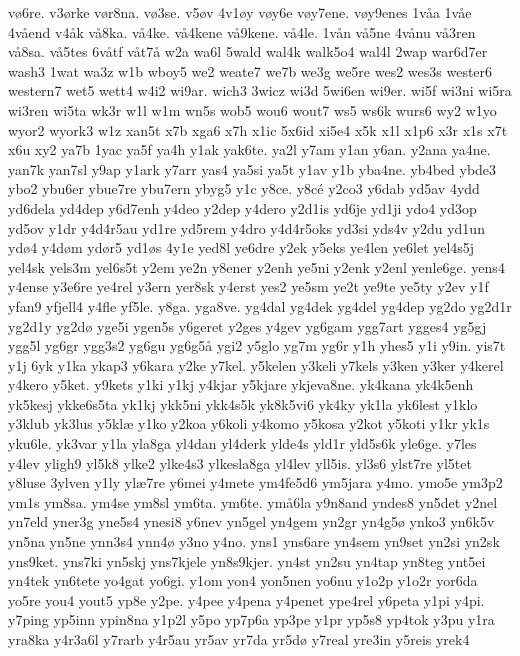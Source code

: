 {v^^f86re.
v3^^f8rke
v^^f8r8na.
v^^f83se.
v5^^f8v
4v1^^f8y
v^^f8y6e
v^^f8y7ene.
v^^f8y9enes
1v^^e5a
1v^^e5e
4v^^e5end
v4^^e5k
v^^e58ka.
v^^e54ke.
v^^e54kene
v^^e59kene.
v^^e54le.
1v^^e5n
v^^e55ne
4v^^e5nu
v^^e53ren
v^^e58sa.
v^^e55tes
6v^^e5tf
v^^e5t7^^e5
w2a
wa6l
5wald
wal4k
walk5o4
wal4l
2wap
war6d7er
wash3
1wat
wa3z
w1b
wboy5
we2
weate7
we7b
we3g
we5re
wes2
wes3s
wester6
western7
wet5
wett4
w4i2
wi9ar.
wich3
3wicz
wi3d
5wi6en
wi9er.
wi5f
wi3ni
wi5ra
wi3ren
wi5ta
wk3r
w1l
w1m
wn5s
wob5
wou6
wout7
ws5
ws6k
wurs6
wy2
w1yo
wyor2
wyork3
w1z
xan5t
x7b
xga6
x7h
x1ic
5x6id
xi5e4
x5k
x1l
x1p6
x3r
x1s
x7t
x6u
xy2
ya7b
1yac
ya5f
ya4h
y1ak
yak6te.
ya2l
y7am
y1an
y6an.
y2ana
ya4ne.
yan7k
yan7sl
y9ap
y1ark
y7arr
yas4
ya5si
ya5t
y1av
y1b
yba4ne.
yb4bed
ybde3
ybo2
ybu6er
ybue7re
ybu7ern
ybyg5
y1c
y8ce.
y8c^^e9
y2co3
y6dab
yd5av
4ydd
yd6dela
yd4dep
y6d7enh
y4deo
y2dep
y4dero
y2d1is
yd6je
yd1ji
ydo4
yd3op
yd5ov
y1dr
y4d4r5au
yd1re
yd5rem
y4dro
y4d4r5oks
yd3si
yds4v
y2du
yd1un
yd^^f84
y4d^^f8m
yd^^f8r5
yd1^^f8s
4y1e
yed8l
ye6dre
y2ek
y5eks
ye4len
ye6let
yel4s5j
yel4sk
yels3m
yel6s5t
y2em
ye2n
y8ener
y2enh
ye5ni
y2enk
y2enl
yenle6ge.
yens4
y4ense
y3e6re
ye4rel
y3ern
yer8sk
y4erst
yes2
ye5sm
ye2t
ye9te
ye5ty
y2ev
y1f
yfan9
yfjell4
y4fle
yf5le.
y8ga.
yga8ve.
yg4dal
yg4dek
yg4del
yg4dep
yg2do
yg2d1r
yg2d1y
yg2d^^f8
yge5i
ygen5s
y6geret
y2ges
y4gev
yg6gam
ygg7art
ygges4
yg5gj
ygg5l
yg6gr
ygg3s2
yg6gu
yg6g5^^e5
ygi2
y5glo
yg7m
yg6r
y1h
yhes5
y1i
y9in.
yis7t
y1j
6yk
y1ka
ykap3
y6kara
y2ke
y7kel.
y5kelen
y3keli
y7kels
y3ken
y3ker
y4kerel
y4kero
y5ket.
y9kets
y1ki
y1kj
y4kjar
y5kjare
ykjeva8ne.
yk4kana
yk4k5enh
yk5kesj
ykke6s5ta
yk1kj
ykk5ni
ykk4s5k
yk8k5vi6
yk4ky
yk1la
yk6lest
y1klo
y3klub
yk3lus
y5kl^^e6
y1ko
y2koa
y6koli
y4komo
y5kosa
y2kot
y5koti
y1kr
yk1s
yku6le.
yk3var
y1la
yla8ga
yl4dan
yl4derk
ylde4s
yld1r
yld5s6k
yle6ge.
y7les
y4lev
yligh9
yl5k8
ylke2
ylke4s3
ylkesla8ga
yl4lev
yll5is.
yl3s6
ylst7re
yl5tet
y8luse
3ylven
y1ly
yl^^e67re
y6mei
y4mete
ym4fe5d6
ym5jara
y4mo.
ymo5e
ym3p2
ym1s
ym8sa.
ym4se
ym8sl
ym6ta.
ym6te.
ym^^e56la
y9n8and
yndes8
yn5det
y2nel
yn7eld
yner3g
yne5s4
ynesi8
y6nev
yn5gel
yn4gem
yn2gr
yn4g5^^f8
ynko3
yn6k5v
yn5na
yn5ne
ynn3s4
ynn4^^f8
y3no
y4no.
yns1
yns6are
yn4sem
yn9set
yn2si
yn2sk
yns9ket.
yns7ki
yn5skj
yns7kjele
yn8s9kjer.
yn4st
yn2su
yn4tap
yn8teg
ynt5ei
yn4tek
yn6tete
yo4gat
yo6gi.
y1om
yon4
yon5nen
yo6nu
y1o2p
y1o2r
yor6da
yo5re
you4
yout5
yp8e
y2pe.
y4pee
y4pena
y4penet
ype4rel
y6peta
y1pi
y4pi.
y7ping
yp5inn
ypin8na
y1p2l
y5po
yp7p6a
yp3pe
y1pr
yp5s8
yp4tok
y3pu
y1ra
yra8ka
y4r3a6l
y7rarb
y4r5au
yr5av
yr7da
yr5d^^f8
y7real
yre3in
y5reis
yrek4
}
